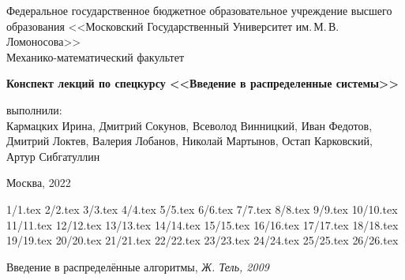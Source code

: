 \documentclass[specialist, subf, href, colorlinks=true, 12pt, times, mtpro, final]{disser}
\theoremstyle{definition}
\begin{document}
\begin{titlepage}
	\begin{center}
		
		Федеральное государственное бюджетное образовательное учреждение высшего образования 
		<<Московский Государственный Университет им.\,М.\,В.\,Ломоносова>>\\
		
		\vspace{9cm}
		Механико-математический факультет
		
		{\bf Конспект лекций по спецкурсу <<Введение в распределенные системы>>}
		
		\vspace{9cm}
		\begin{flushright}
			{ выполнили:}\\
			Кармацких Ирина, Дмитрий Сокунов, Всеволод Винницкий, Иван Федотов, Дмитрий Локтев, Валерия Лобанов, Николай Мартынов, Остап Карковский, Артур Сибгатуллин\\[0.5cm]
		\end{flushright}
		\vspace{1cm}
		
		\normalsize Москва, 2022
	\end{center}
\end{titlepage}

	
\tableofcontents
	
 {1/1.tex}
 {2/2.tex}
 {3/3.tex}
 {4/4.tex}
 {5/5.tex}
 {6/6.tex}
 {7/7.tex}
 {8/8.tex}
 {9/9.tex}
 {10/10.tex}
 {11/11.tex}
 {12/12.tex}
 {13/13.tex}
 {14/14.tex}
 {15/15.tex}
 {16/16.tex}
 {17/17.tex}
 {18/18.tex}
 {19/19.tex}
 {20/20.tex}
 {21/21.tex}
 {22/22.tex}
 {23/23.tex}
 {24/24.tex}
 {25/25.tex}
 {26/26.tex}

\newpage
\begin{thebibliography}{100}
	 Введение в распределённые алгоритмы,
    \emph{Ж. Тель, 2009}
	
\end{thebibliography}
\end{document}
